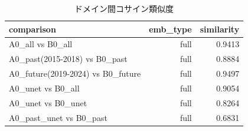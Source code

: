 \begin{table}[htbp]
  \centering
  \caption{ドメイン間コサイン類似度}
  \label{tab:domain_sim}
  \begin{tabular}{lrr}
    \hline
    comparison & emb\_type & similarity \\
    \hline
    A0\_all vs B0\_all & full & 0.9413 \\
    A0\_past(2015-2018) vs B0\_past & full & 0.8884 \\
    A0\_future(2019-2024) vs B0\_future & full & 0.9497 \\
    A0\_unet vs B0\_all & full & 0.9054 \\
    A0\_unet vs B0\_unet & full & 0.8264 \\
    A0\_past\_unet vs B0\_past & full & 0.6831 \\
    \hline
  \end{tabular}
\end{table}